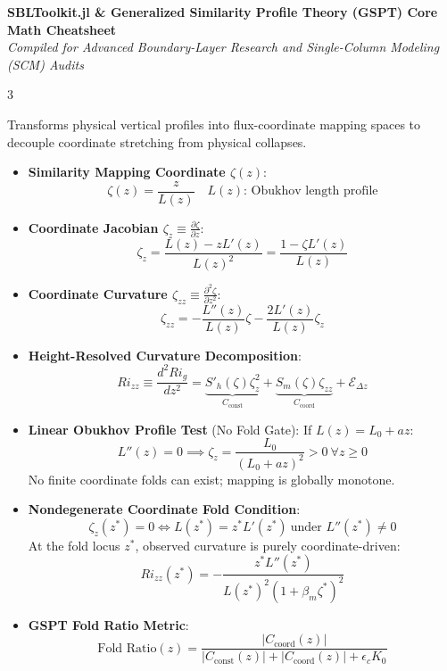 \documentclass[9pt,landscape,letterpaper]{article}
\begin{document}

\begin{center}
    \textbf{\large SBLToolkit.jl \& Generalized Similarity Profile Theory (GSPT) Core Math Cheatsheet} \\
    \vskip 0.5mm
    \footnotesize \textit{Compiled for Advanced Boundary-Layer Research and Single-Column Modeling (SCM) Audits}
\end{center}
\vskip 1mm

\begin{multicols}{3}
\footnotesize

\begin{tcolorbox}[cheatsheetbox, title=1. GSPT Curvature Decomposition]
Transforms physical vertical profiles into flux-coordinate mapping spaces to decouple coordinate stretching from physical collapses.
\begin{itemize}
    \item \textbf{Similarity Mapping Coordinate $\zeta(z)$}:
    $$\zeta(z) = \frac{z}{L(z)} \quad L(z)\text{: Obukhov length profile}$$
    \item \textbf{Coordinate Jacobian $\zeta_z \equiv \frac{\partial \zeta}{\partial z}$}:
    $$\zeta_z = \frac{L(z) - z L'(z)}{L(z)^2} = \frac{1 - \zeta L'(z)}{L(z)}$$
    \item \textbf{Coordinate Curvature $\zeta_{zz} \equiv \frac{\partial^2 \zeta}{\partial z^2}$}:
    $$\zeta_{zz} = -\frac{L''(z)}{L(z)}\zeta - \frac{2 L'(z)}{L(z)}\zeta_z$$
    \item \textbf{Height-Resolved Curvature Decomposition}:
    $$Ri_{zz} \equiv \frac{d^2 Ri_g}{dz^2} = \underbrace{S'_h(\zeta)\zeta_z^2}_{C_{\text{const}}} + \underbrace{S_m(\zeta)\zeta_{zz}}_{C_{\text{coord}}} + \mathcal{E}_{\Delta z}$$
    \item \textbf{Linear Obukhov Profile Test} (No Fold Gate):
    If $L(z) = L_0 + az$:
    $$L''(z) = 0 \implies \zeta_z = \frac{L_0}{(L_0 + az)^2} > 0 \ \forall z \ge 0$$
    No finite coordinate folds can exist; mapping is globally monotone.
    \item \textbf{Nondegenerate Coordinate Fold Condition}:
    $$\zeta_z(z^*) = 0 \iff L(z^*) = z^* L'(z^*) \ \text{under } L''(z^*) \neq 0$$
    At the fold locus $z^*$, observed curvature is purely coordinate-driven:
    $$Ri_{zz}(z^*) = -\frac{z^* L''(z^*)}{L(z^*)^2 (1 + \beta_m \zeta^*)^2}$$
    \item \textbf{GSPT Fold Ratio Metric}:
    $$\text{Fold Ratio}(z) = \frac{|C_{\text{coord}}(z)|}{|C_{\text{const}}(z)| + |C_{\text{coord}}(z)| + \epsilon_c K_0}$$
\end{itemize}
\end{tcolorbox}
\columnbreak


\end{multicols}
\end{document}
